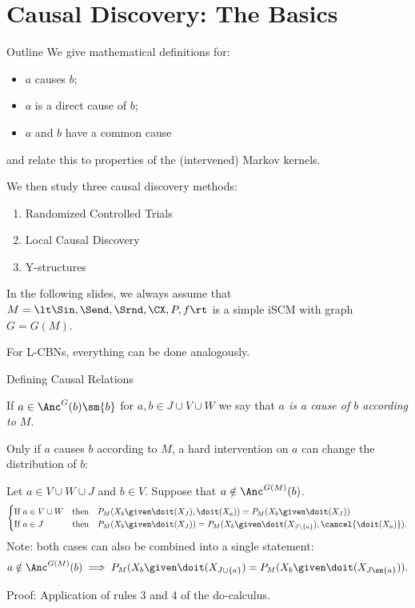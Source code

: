 \part{Causal Discovery: The Basics}
\frame{\partpage}

\begin{frame}{Outline}
  We give mathematical definitions for:
  \begin{itemize}
    \item $a$ causes $b$;
    \item $a$ is a direct cause of $b$;
    \item $a$ and $b$ have a common cause
  \end{itemize}
  and relate this to properties of the (intervened) Markov kernels.

  \medskip
  We then study three causal discovery methods:
  \begin{enumerate}
    \item Randomized Controlled Trials
    \item Local Causal Discovery
    \item Y-structures
  \end{enumerate}

  \bigskip
  In the following slides, we always assume that
  $M = \lt \Sin, \Send, \Srnd, \CX, P, f \rt$ is a simple iSCM with graph $G = G(M)$.

  \bigskip
  For L-CBNs, everything can be done analogously.
\end{frame}

\begin{frame}{Defining Causal Relations}\label{frame:causes}
\begin{Def}[\ref{def:cause_of}]
  If $a \in \Anc^G(b)\sm \{b\}$ for $a, b \in J \cup V \cup W$ we say that \emph{$a$ is a cause of $b$ according to $M$}.
\end{Def}
Only if $a$ causes $b$ according to $M$, a hard intervention on $a$ can change the distribution of $b$: 
\begin{Prp}[\ref{prp:scm_causes_separation}]
  Let $a \in V \cup W \cup J$ and $b \in V$. Suppose that $a \notin \Anc^{G(M)}(b)$.
  $$\begin{cases}
    \text{If } a \in V \cup W & \text{then\quad} P_{M}(X_b \given \doit(X_J), \doit(X_a)) = P_{M}(X_b \given \doit(X_J)) \\
    \text{If } a \in J        & \text{then\quad} P_{M}(X_b \given \doit(X_J)) = P_{M}(X_b \given \doit(X_{J\setminus \{a\}}),\cancel{\doit(X_a)}).
  \end{cases}$$
  Note: both cases can also be combined into a single statement:
    $$a \notin \Anc^{G(M)}(b) \implies P_{M}(X_b \given \doit(X_{J \cup \{a\}}) = P_{M}(X_b \given \doit(X_{J\sm\{a\}})).$$
\end{Prp}
Proof: Application of rules 3 and 4 of the do-calculus.
\end{frame}

